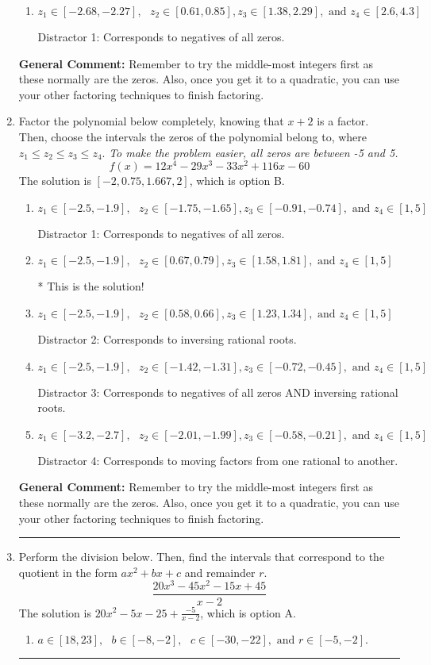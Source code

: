 \documentclass{extbook}[14pt]
\newcommand{\litem}[1]{\item #1

\rule{\textwidth}{0.4pt}}
\begin{document}
\begin{enumerate}
{\begin{enumerate}[label=\Alph*.]
 Distractor 2: Corresponds to inversing rational roots.
\item \( z_1 \in [-2.68, -2.27], \text{   }  z_2 \in [0.61, 0.85], z_3 \in [1.38, 2.29], \text{   and   } z_4 \in [2.6, 4.3] \)

 Distractor 1: Corresponds to negatives of all zeros.
\end{enumerate}

\textbf{General Comment:} Remember to try the middle-most integers first as these normally are the zeros. Also, once you get it to a quadratic, you can use your other factoring techniques to finish factoring.
}
\litem{
Factor the polynomial below completely, knowing that $x + 2$ is a factor. Then, choose the intervals the zeros of the polynomial belong to, where $z_1 \leq z_2 \leq z_3 \leq z_4$. \textit{To make the problem easier, all zeros are between -5 and 5.}
\[ f(x) = 12x^{4} -29 x^{3} -33 x^{2} +116 x -60 \]The solution is \( [-2, 0.75, 1.667, 2] \), which is option B.\begin{enumerate}[label=\Alph*.]
\item \( z_1 \in [-2.5, -1.9], \text{   }  z_2 \in [-1.75, -1.65], z_3 \in [-0.91, -0.74], \text{   and   } z_4 \in [1, 5] \)

 Distractor 1: Corresponds to negatives of all zeros.
\item \( z_1 \in [-2.5, -1.9], \text{   }  z_2 \in [0.67, 0.79], z_3 \in [1.58, 1.81], \text{   and   } z_4 \in [1, 5] \)

* This is the solution!
\item \( z_1 \in [-2.5, -1.9], \text{   }  z_2 \in [0.58, 0.66], z_3 \in [1.23, 1.34], \text{   and   } z_4 \in [1, 5] \)

 Distractor 2: Corresponds to inversing rational roots.
\item \( z_1 \in [-2.5, -1.9], \text{   }  z_2 \in [-1.42, -1.31], z_3 \in [-0.72, -0.45], \text{   and   } z_4 \in [1, 5] \)

 Distractor 3: Corresponds to negatives of all zeros AND inversing rational roots.
\item \( z_1 \in [-3.2, -2.7], \text{   }  z_2 \in [-2.01, -1.99], z_3 \in [-0.58, -0.21], \text{   and   } z_4 \in [1, 5] \)

 Distractor 4: Corresponds to moving factors from one rational to another.
\end{enumerate}

\textbf{General Comment:} Remember to try the middle-most integers first as these normally are the zeros. Also, once you get it to a quadratic, you can use your other factoring techniques to finish factoring.
}
\litem{
Perform the division below. Then, find the intervals that correspond to the quotient in the form $ax^2+bx+c$ and remainder $r$.
\[ \frac{20x^{3} -45 x^{2} -15 x + 45}{x -2} \]The solution is \( 20x^{2} -5 x -25 + \frac{-5}{x -2} \), which is option A.\begin{enumerate}[label=\Alph*.]
\item \( a \in [18, 23], \text{   } b \in [-8, -2], \text{   } c \in [-30, -22], \text{   and   } r \in [-5, -2]. \)


\end{enumerate}}
\end{enumerate}
\end{document}

